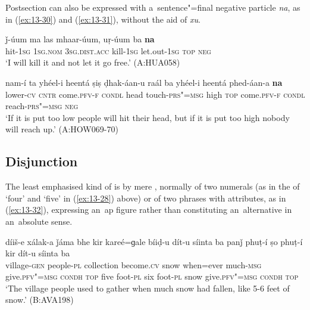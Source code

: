  Postsection can also be expressed with a~sentence"=final negative particle \textit{na}, as in (\ref{ex:13-30}) and (\ref{ex:13-31}), without the aid of \textit{xu}. 

\ea
\label{ex:13-30}
\gll ǰ-úum ma las mhaar-úum, uṛ-úum ba \textbf{na}\\
hit-\textsc{1sg} \textsc{1sg.nom} \textsc{3sg.dist.acc} kill-\textsc{1sg} let.out-\textsc{1sg}
\textsc{top} \textsc{neg} \\
\glt `I will kill it and not let it go free.' (A:HUA058)

\ex
\label{ex:13-31}
\gll nam-í ta yhéel-i heentá ṣiṣ ḍhak-áan-u raál ba yhéel-i heentá phed-áan-a \textbf{na} \\
lower-\textsc{cv} \textsc{cntr} come.\textsc{pfv-f} \textsc{condl} head touch-\textsc{prs"=msg}  high \textsc{top} come.\textsc{pfv-f} \textsc{condl} reach-\textsc{prs"=msg} \textsc{neg} \\
\glt `If it is put too low people will hit their head, but if it is put too high nobody will reach up.' (A:HOW069-70)
\z

\subsection{Disjunction}
\label{subsec:13-2-3}

 The least emphasised kind of  is by mere , normally of two numerals (as in the  of `four' and `five' in (\ref{ex:13-28}) above) or of two  phrases with  attributes, as in (\ref{ex:13-32}), expressing an~ap figure rather than constituting an~alternative in an~absolute sense.

\begin{exe}
\ex
\label{ex:13-32}
\gll díiš-e xálak-a ǰáma bhe kir kareé=ɡale bíiḍ-u dít-u síinta ba {\ob}panǰ phuṭ-í ṣo phuṭ-í{\cb} kir dít-u síinta ba\\
village-\textsc{gen} people-\textsc{pl} collection become.\textsc{cv} snow  when=ever much-\textsc{msg} give.\textsc{pfv"=msg} \textsc{condh} \textsc{top} five  foot-\textsc{pl} six foot-\textsc{pl} snow give.\textsc{pfv"=msg} \textsc{condh} \textsc{top} \\
\glt `The village people used to gather when much snow had fallen, like 5-6 feet of snow.' (B:AVA198) 
\end{exe}

